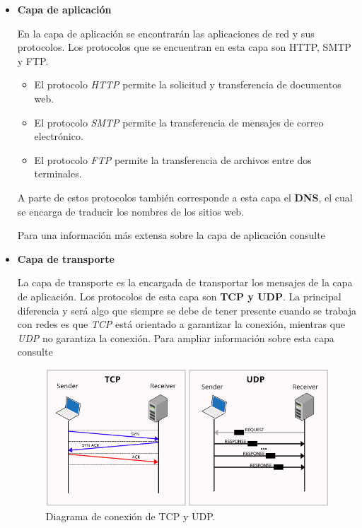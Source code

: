 \begin{itemize}

\item \textbf{Capa de aplicación}

En la capa de aplicación se encontrarán las aplicaciones de red y sus protocolos. 
Los protocolos que se encuentran en esta capa son HTTP, SMTP y FTP.

\begin{itemize}
\item El protocolo \textit{HTTP} permite la solicitud y transferencia de documentos web.
\item El protocolo \textit{SMTP} permite la transferencia de mensajes de correo electrónico.
\item El protocolo \textit{FTP} permite la transferencia de archivos entre dos terminales.
\end{itemize}

A parte de estos protocolos también corresponde a esta capa el \textbf{DNS}, el cual se encarga 
de traducir los nombres de los sitios web. 

\intro Para una información más extensa sobre la capa de aplicación consulte \cite{redes2010b}

\item \textbf{Capa de transporte}

La capa de transporte es la encargada de transportar los mensajes de la capa de aplicación. 
Los protocolos de esta capa son \textbf{TCP y UDP}. La principal diferencia y será algo que 
siempre se debe de tener presente cuando se trabaja con redes es que \textit{TCP} está orientado 
a garantizar la conexión, mientras que \textit{UDP} no garantiza la conexión.
\intro Para ampliar información sobre esta capa consulte \cite{redes2010c}

\begin{figure}[H]
  \includegraphics[width=1\textwidth]{imagenes/tcpudp.jpeg}
  \centering
  \caption{Diagrama de conexión de TCP y UDP.}
\end{figure}


\end{itemize}
